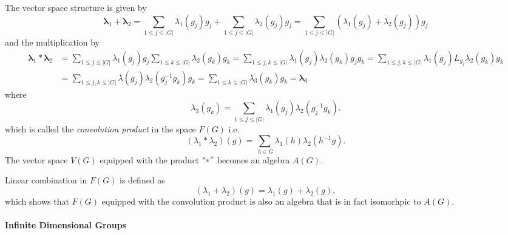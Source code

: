 \documentclass[aps,preprint]{revtex4}
\begin{document}
The vector space structure is given by 
\begin{equation}
\mathbf{\lambda}_{1}+\mathbf{\lambda}_{2}=\sum_{1\leq j\leq\left\vert
G\right\vert }\lambda_{1}\left( g_{j}\right) g_{j}+\sum_{1\leq
j\leq\left\vert G\right\vert }\lambda_{2}\left( g_{j}\right)
g_{j}=\sum_{1\leq j\leq\left\vert G\right\vert }\left( \lambda_{1}\left(
g_{j}\right) +\lambda_{2}\left( g_{j}\right) \right) g_{j}
\end{equation}
and the multiplication by 
\begin{align}
\mathbf{\lambda}_{1}\ast\mathbf{\lambda}_{2} & =\sum_{1\leq j\leq\left\vert
G\right\vert }\lambda_{1}\left( g_{j}\right) g_{j}\sum_{1\leq k\leq
\left\vert G\right\vert }\lambda_{2}\left( g_{k}\right) g_{k}=\sum_{1\leq
j,k\leq\left\vert G\right\vert }\lambda_{1}\left( g_{j}\right) \lambda
_{2}\left( g_{k}\right) g_{j}g_{k}=\sum_{1\leq j,k\leq\left\vert
G\right\vert }\lambda_{1}\left( g_{j}\right) L_{g_{j}}\lambda_{2}\left(
g_{k}\right) g_{k} \\
& =\sum_{1\leq j,k\leq\left\vert G\right\vert }\lambda\left( g_{j}\right)
\lambda_{2}\left( g_{j}^{-1}g_{k}\right) g_{k}=\sum_{1\leq k\leq\left\vert
G\right\vert }\lambda_{3}\left( g_{k}\right) g_{k}=\mathbf{\lambda}_{3}
\end{align}
where 
\begin{equation}
\lambda_{3}\left( g_{k}\right) =\sum_{1\leq j\leq\left\vert G\right\vert
}\lambda_{1}\left( g_{j}\right) \lambda_{2}\left( g_{j}^{-1}g_{k}\right) .
\end{equation}
which is called the \emph{convolution product }in the space $F\left(
G\right) $ i.e. 
\begin{equation}
\left( \lambda_{1}\ast\lambda_{2}\right) \left( g\right) =\sum_{\ h\in
G}\lambda_{1}\left( h\right) \lambda_{2}\left( h^{-1}g\right) .
\end{equation}
The vector space $V\left( G\right) $ equipped with the product "$\ast"$
becomes an algebra $A\left( G\right) .$

Linear combination in $F\left( G\right) $ is defined as 
\begin{equation}
\left( \lambda_{1}+\lambda_{2}\right) \left( g\right) =\lambda_{1}\left(
g\right) +\lambda_{2}\left( g\right) ,
\end{equation}
which shows that $F\left( G\right) $ equipped with the convolution product
is also an algebra that is in fact isomorhpic to $A\left( G\right) .$

\paragraph{Infinite Dimensional Groups}
\end{document}

